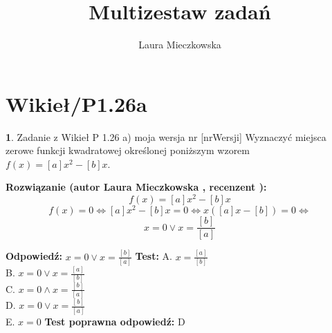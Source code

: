 \documentclass[12pt, a4paper]{article}
\title{Multizestaw zadań}
\author{Laura Mieczkowska}
\date{}
\theoremstyle{definition} %
\newtheorem{zad}{}
\newcommand{\kategoria}[1]{\section{#1}} %
\newcommand{\zadStart}[1]{\begin{zad}#1\newline} %
\newcommand{\zadStop}{\end{zad}}   %
\newcommand{\rozwStart}[2]{\noindent \textbf{Rozwiązanie (autor #1 , recenzent #2): }\newline} %
\newcommand{\odpStart}{\noindent \textbf{Odpowiedź:}\newline}    %
\newcommand{\odpStop}{\newline}                                             %
\newcommand{\testStart}{\noindent \textbf{Test:}\newline} %
\newcommand{\testStop}{\newline} %
\newcommand{\kluczStart}{\noindent \textbf{Test poprawna odpowiedź:}\newline} %
\newcommand{\kluczStop}{\newline} %
\begin{document}
\maketitle


\kategoria{Wikieł/P1.26a}
\zadStart{Zadanie z Wikieł P 1.26 a) moja wersja nr [nrWersji]}
Wyznaczyć miejsca zerowe funkcji kwadratowej określonej poniższym wzorem $f(x)=[a]x^2-[b]x$.
\zadStop
\rozwStart{Laura Mieczkowska}{}
$$f(x)=[a]x^2-[b]x$$
$$f(x)=0 \Longleftrightarrow [a]x^2-[b]x=0 \Longleftrightarrow x([a]x-[b])=0 \Longleftrightarrow $$ 
$$x=0 \vee x=\frac{[b]}{[a]}$$

\odpStart
$x=0 \vee x=\frac{[b]}{[a]}$
\odpStop
\testStart
A. $x=\frac{[a]}{[b]}$ \\
B. $x=0 \vee x=\frac{[a]}{[b]}$ \\
C. $x=0 \wedge x=\frac{[b]}{[a]}$ \\
D. $x=0 \vee x=\frac{[b]}{[a]}$ \\
E. $x=0$
\testStop
\kluczStart
D
\kluczStop
\end{document}
